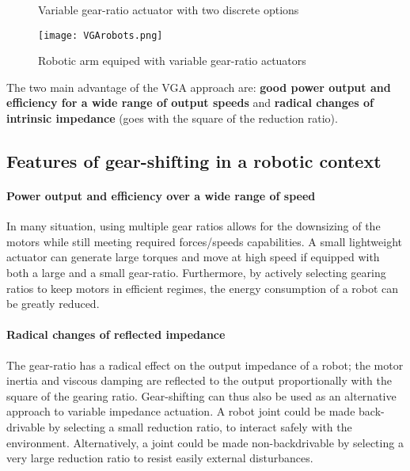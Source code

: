 \begin{figure}[htb]
        \centering
        \caption{Variable gear-ratio actuator with two discrete options}\label{fig:2s}
\end{figure}

\begin{figure}[htb]
        \centering
				\texttt{[image: VGArobots.png]}
        \caption{Robotic arm equiped with variable gear-ratio actuators}\label{fig:vgarobots}
\end{figure}


The two main advantage of the VGA approach are: \textbf{good power output and efficiency for a wide range of output speeds} and \textbf{radical changes of intrinsic impedance} (goes with the square of the reduction ratio). 

\subsection{Features of gear-shifting in a robotic context}

\paragraph{Power output and efficiency over a wide range of speed}
In many situation, using multiple gear ratios allows for the downsizing of the motors while still meeting required forces/speeds capabilities. A small lightweight actuator can generate large torques and move at high speed if equipped with both a large and a small gear-ratio. Furthermore, by actively selecting gearing ratios to keep motors in efficient regimes, the energy consumption of a robot can be greatly reduced. 

\paragraph{Radical changes of reflected impedance}
The gear-ratio has a radical effect on the output impedance of a robot; the motor inertia and viscous damping are reflected to the output proportionally with the square of the gearing ratio. Gear-shifting can thus also be used as an alternative approach to variable impedance actuation. A robot joint could be made back-drivable by selecting a small reduction ratio, to interact safely with the environment.  Alternatively, a joint could be made non-backdrivable by selecting a very large reduction ratio to resist easily external disturbances.

